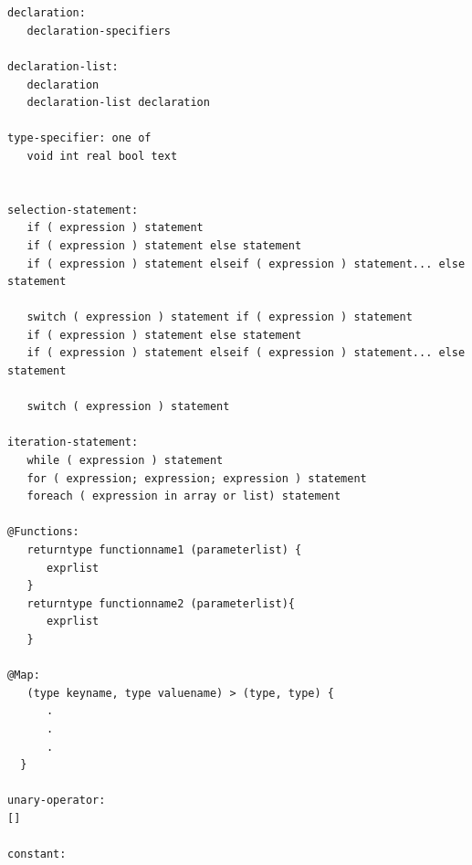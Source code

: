 \documentclass{article}
\begin{document}
\begin{verbatim}


declaration:
   declaration-specifiers

declaration-list:
   declaration
   declaration-list declaration

type-specifier: one of
   void int real bool text


selection-statement:
   if ( expression ) statement
   if ( expression ) statement else statement
   if ( expression ) statement elseif ( expression ) statement... else statement

   switch ( expression ) statement if ( expression ) statement
   if ( expression ) statement else statement
   if ( expression ) statement elseif ( expression ) statement... else statement
 
   switch ( expression ) statement

iteration-statement:  
   while ( expression ) statement
   for ( expression; expression; expression ) statement
   foreach ( expression in array or list) statement

@Functions:
   return­type function­name­1 (parameter­list) {
      exprlist 
   }
   returntype functionname2 (parameterlist){
      exprlist
   }

@Map: 
   (type key­name, type value­name) ­> (type, type) {
      .
      .
      .
  }

unary-operator:
[]

constant:

\end{verbatim}

\end{document}
